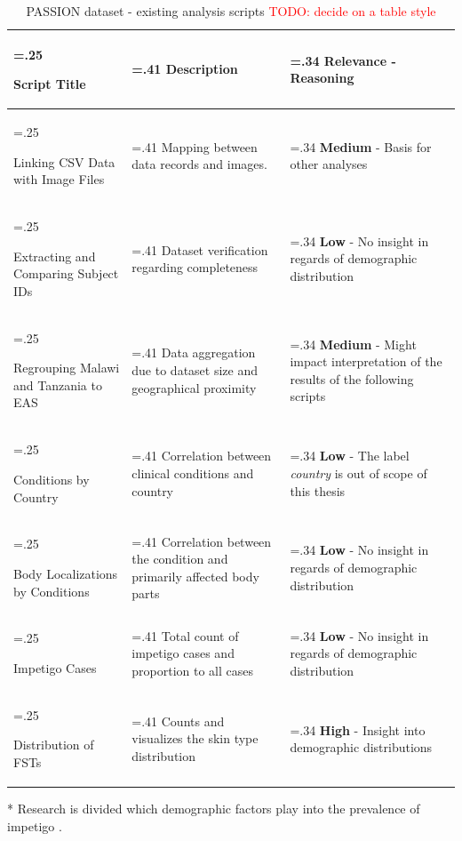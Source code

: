 \documentclass[12pt, a4paper, oneside]{book}   	%
\renewcommand{\todo}[1]{\textcolor{red}{TODO: #1}}
\begin{document}
				\begin{table}[H]
					\centering
					\begin{threeparttable}
					\begin{tabularx}{\textwidth}{>{\hsize=.25\hsize\raggedright}X>{\hsize=.41\hsize}X>{\hsize=.34\hsize}X}
						\toprule
						\textbf{Script Title}       & \textbf{Description} & \textbf{Relevance - Reasoning}       \\ \midrule
						Linking CSV Data with Image Files & 
						Mapping between data records and images. &
						\textbf{Medium} - Basis for other analyses \\
						\hline
						Extracting and Comparing Subject IDs &
						Dataset verification regarding completeness &
						\textbf{Low} - No insight in regards of demographic distribution \\
						\hline
						Regrouping Malawi and Tanzania to EAS &
						Data aggregation due to dataset size and geographical proximity &
						\textbf{Medium} - Might impact interpretation of the results of the following scripts \\
						\hline
						Conditions by Country &
						Correlation between clinical conditions and country &
						\textbf{Low} - The label \textit{country} is out of scope of this thesis \\
						\hline
						Body Localizations by Conditions &
						Correlation between the condition and primarily affected body parts &
						\textbf{Low} - No insight in regards of demographic distribution \\
						\hline
						Impetigo Cases &
						Total count of impetigo cases and proportion to all cases &
						\textbf{Low} - No insight in regards of demographic distribution\tnote{*} \\
						\hline
						Distribution of \glspl{FST} &
						Counts and visualizes the skin type distribution  &
						\textbf{High} - Insight into demographic distributions \\
						\bottomrule
					\end{tabularx}
						\begin{tablenotes}
							\footnotesize
							\item[*] Research is divided which demographic factors play into the prevalence of impetigo \autocites{Romani_2017}{Aleid_2024}.
						\end{tablenotes}
					\end{threeparttable}
					
					\caption{PASSION dataset - existing analysis scripts \autocite{Gottfrois2024} \todo{decide on a table style}}
					\label{tab:PASSION_scripts}
				\end{table}
\end{document}
